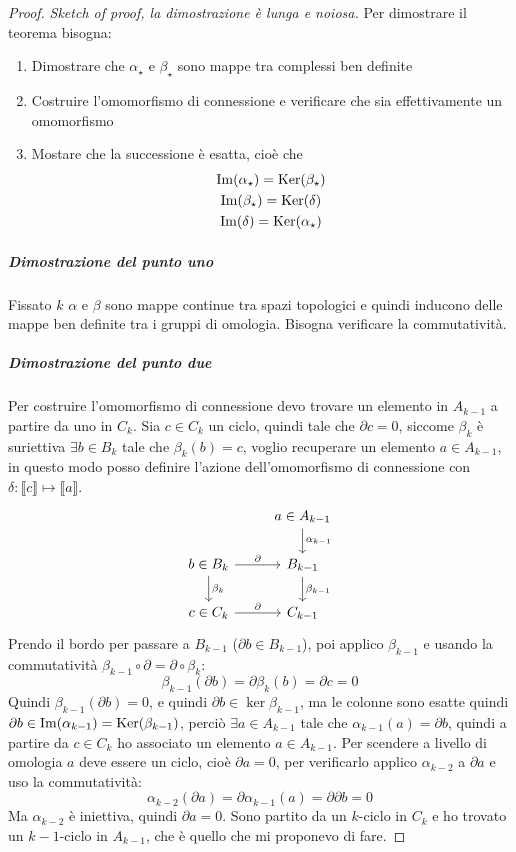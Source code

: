 \begin{proof}
  \emph{Sketch of proof, la dimostrazione è lunga e noiosa.}
  Per dimostrare il teorema bisogna:
  \begin{enumerate}
  \item Dimostrare che $ \alpha_\star $ e $ \beta_\star $ sono mappe tra complessi ben definite
  \item Costruire l'omomorfismo di connessione e verificare che sia effettivamente un omomorfismo
  \item Mostare che la successione è esatta, cioè che
    \begin{gather*}
      \mathrm{Im}( \alpha_\star ) = \mathrm{Ker}( \beta_\star) \\
      \mathrm{Im}( \beta_\star ) = \mathrm{Ker}( \delta) \\
      \mathrm{Im}( \delta ) = \mathrm{Ker}( \alpha_\star)
    \end{gather*}
  \end{enumerate}

  \subparagraph{Dimostrazione del punto uno} Fissato $ k $ $ \alpha $ e
  $ \beta $ sono mappe continue tra spazi topologici e quindi inducono delle mappe
  ben definite tra i gruppi di omologia. Bisogna verificare la commutatività.

  \subparagraph{Dimostrazione del punto due}

  Per costruire l'omomorfismo di connessione devo trovare un
  elemento in $ A_{k-1} $ a partire da uno in $ C_k $.
  Sia $ c \in C_k $ un ciclo, quindi tale che $ \partial c = 0 $,
  siccome $ \beta_k $ è suriettiva $ \exists b \in B_k $ tale che
  $ \beta_k(b) = c $, voglio recuperare un elemento $ a \in A_{k-1} $,
  in questo modo posso definire l'azione dell'omomorfismo
  di connessione con $ \delta \colon \llbracket c \rrbracket \mapsto \llbracket a \rrbracket $.
  \[
    \begin{tikzcd}
      {} & a \in A_{k-1} \arrow{d}{\alpha_{k-1}} \\
      b \in B_k \arrow{r}{\partial} \arrow{d}{\beta_k} & B_{k-1} \arrow{d}{\beta_{k-1}} \\
      c \in C_k \arrow{r}{\partial} & C_{k-1}
    \end{tikzcd}
  \]
  Prendo il bordo per passare a $ B_{k-1} $ ($ \partial b \in B_{k-1} $), poi
  applico $ \beta_{k-1} $ e usando la commutatività $ \beta_{k-1} \circ \partial = \partial \circ \beta_k $:
  \[
    \beta_{k-1}(\partial b) = \partial \beta_k (b) = \partial c = 0
  \]
  Quindi $ \beta_{k-1}(\partial b) = 0 $, e quindi $ \partial b \in \ker{\beta_{k-1}} $, ma
  le colonne sono esatte quindi $ \partial b \in \mathrm{Im}( \alpha_{k-1} ) = \mathrm{Ker}( \beta_{k-1}) $,
  perciò $ \exists a \in A_{k-1} $ tale che $ \alpha_{k-1}(a) = \partial b $, quindi
  a partire da $ c \in C_k $ ho associato un elemento $ a \in A_{k-1} $.
  Per scendere a livello di omologia $ a $ deve essere un ciclo,
  cioè $ \partial a = 0 $, per verificarlo applico $ \alpha_{k-2} $ a $ \partial a $
  e uso la commutatività:
  \[
    \alpha_{k-2}(\partial a) = \partial \alpha_{k-1}(a) = \partial \partial b = 0
  \]
  Ma $ \alpha_{k-2} $ è iniettiva, quindi $ \partial a = 0 $.
  Sono partito da un $ k $-ciclo in $ C_k $ e
  ho trovato un $ k-1 $-ciclo in $ A_{k-1} $,
  che è quello che mi proponevo di fare.


\end{proof}
